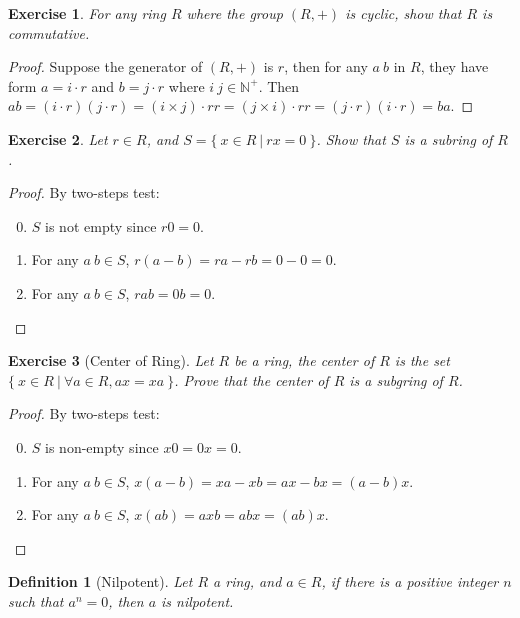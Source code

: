 \documentclass[14pt]{extarticle}
\newtheorem{definition}{Definition}[section]
\newtheorem{exercise}{Exercise}[section]
\newcommand{\1}{\{e\}}
\newcommand{\N}{\mathbb{N}}
\newcommand{\set}[2]{\{ \ #1 \ | \ #2 \ \}}
\begin{document}
\begin{exercise}
  For any ring $R$ where the group $(R, +)$ is cyclic, show that $R$ is commutative.
\end{exercise}
\begin{proof}
  Suppose the generator of $(R, +)$ is $r$, then for any $a \ b$ in $R$, 
  they have form $a = i \cdot r$ and $b = j \cdot r$ where $i \ j \in \N^+$.
  Then $ab = (i \cdot r)(j \cdot r) = (i \times j) \cdot rr = (j \times i) \cdot rr = (j \cdot r) (i \cdot r) = ba$.
\end{proof}

\begin{exercise}
  Let $r \in R$, and $S = \set{x \in R}{rx = 0}$. Show that $S$ is a subring of $R$.
\end{exercise}
\begin{proof}
  By two-steps test:
  \begin{enumerate}
    \setcounter{enumi}{-1}
    \item $S$ is not empty since $r0 = 0$.
    \item For any $a \ b \in S$, $r(a - b) = ra - rb = 0 - 0 = 0$.
    \item For any $a \ b \in S$, $rab = 0b = 0$.
  \end{enumerate}
\end{proof}

\begin{exercise}[Center of Ring]
  Let $R$ be a ring, the center of $R$ is the set $\set{x \in R}{\forall a \in R, ax = xa}$.
  Prove that the center of $R$ is a subgring of $R$.
\end{exercise}
\begin{proof}
  By two-steps test: 
  \begin{enumerate}
    \setcounter{enumi}{-1}
    \item $S$ is non-empty since $x0 = 0x = 0$.
    \item For any $a \ b \in S$, $x(a - b) = xa - xb = ax - bx = (a - b)x$.
    \item For any $a \ b \in S$, $x(ab) = axb = abx = (ab)x$.
  \end{enumerate}
\end{proof}

\begin{definition}[Nilpotent]
  Let $R$ a ring, and $a \in R$, if there is a positive integer $n$
  such that $a^n = 0$, then $a$ is nilpotent.
\end{definition}
\end{document}
